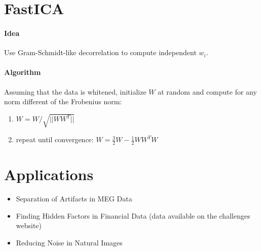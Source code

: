 \documentclass[a4paper,twoside,10pt]{article}
\begin{document}
\section{FastICA}
\paragraph{Idea} Use Gram-Schmidt-like decorrelation to compute independent $w_i$.
\paragraph{Algorithm} Assuming that the data is whitened, initialize $W$ at random and compute for any norm different of the Frobenius norm:
\begin{enumerate}
\item $W=W/\sqrt{||WW^T||}$
\item repeat until convergence: $W=\frac{3}{2}W-\frac{1}{2}WW^TW$
\end{enumerate}

\section{Applications}
\begin{itemize}
\item Separation of Artifacts in MEG Data
\item Finding Hidden Factors in Financial Data (data available on the challenges website)
\item Reducing Noise in Natural Images
\end{itemize}
 
\end{document}
